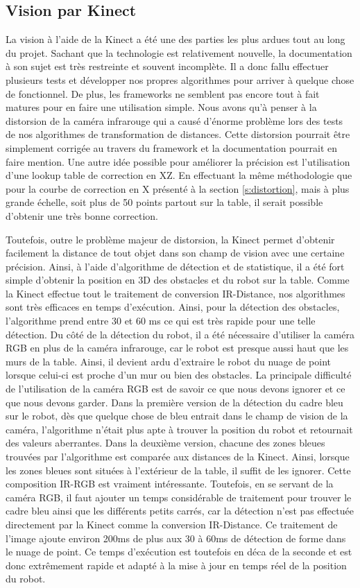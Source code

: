 \subsection{Vision par Kinect}
La vision à l'aide de la Kinect a été une des parties les plus ardues tout au long du projet. Sachant que la technologie est relativement nouvelle, la documentation à son sujet est très restreinte et souvent incomplète. Il a donc fallu effectuer plusieurs tests et développer nos propres algorithmes pour arriver à quelque chose de fonctionnel. De plus, les frameworks ne semblent pas encore tout à fait matures pour en faire une utilisation simple. Nous avons qu'à penser à la distorsion de la caméra infrarouge qui a causé d'énorme problème lors des tests de nos algorithmes de transformation de distances. Cette distorsion pourrait être simplement corrigée au travers du framework et la documentation pourrait en faire mention. Une autre idée possible pour améliorer la précision est l'utilisation d'une lookup table de correction en XZ. En effectuant la même méthodologie que pour la courbe de correction en X présenté à la section \ref{s:distortion}, mais à plus grande échelle, soit plus de 50 points partout sur la table, il serait possible d'obtenir une très bonne correction.

Toutefois, outre le problème majeur de distorsion, la Kinect permet d'obtenir facilement la distance de tout objet dans son champ de vision avec une certaine précision. Ainsi, à l'aide d'algorithme de détection et de statistique, il a été fort simple d'obtenir la position en 3D des obstacles et du robot sur la table. Comme la Kinect effectue tout le traitement de conversion IR-Distance, nos algorithmes sont très efficaces en temps d'exécution. Ainsi, pour la détection des obstacles, l'algorithme prend entre 30 et 60 ms ce qui est très rapide pour une telle détection. Du côté de la détection du robot, il a été nécessaire d'utiliser la caméra RGB en plus de la caméra infrarouge, car le robot est presque aussi haut que les murs de la table. Ainsi, il devient ardu d'extraire le robot du nuage de point lorsque celui-ci est proche d'un mur ou bien des obstacles. La principale difficulté de l'utilisation de la caméra RGB est de savoir ce que nous devons ignorer et ce que nous devons garder. Dans la première version de la détection du cadre bleu sur le robot, dès que quelque chose de bleu entrait dans le champ de vision de la caméra, l'algorithme n'était plus apte à trouver la position du robot et retournait des valeurs aberrantes. Dans la deuxième version, chacune des zones bleues trouvées par l'algorithme est comparée aux distances de la Kinect. Ainsi, lorsque les zones bleues sont situées à l'extérieur de la table, il suffit de les ignorer. Cette composition IR-RGB est vraiment intéressante. Toutefois, en se servant de la caméra RGB, il faut ajouter un temps considérable de traitement pour trouver le cadre bleu ainsi que les différents petits carrés, car la détection n'est pas effectuée directement par la Kinect comme la conversion IR-Distance. Ce traitement de l'image ajoute environ 200ms de plus aux 30 à 60ms de détection de forme dans le nuage de point. Ce temps d'exécution est toutefois en déca de la seconde et est donc extrêmement rapide et adapté à la mise à jour en temps réel de la position du robot.

